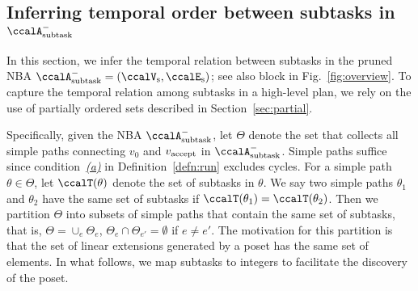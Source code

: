 \documentclass[Afour,sageh,times]{sagej}
\newcommand*\circled[1]{\tikz[baseline=(char.base)]{
            \node[shape=circle,draw,inner sep=1pt] (char) {#1};}}
\newtheorem{rem}[thm]{Remark}
\newcommand{\auto}[1]{\ccalA_{\textup{#1}}}
\newcommand{\vertex}[1]{v_{\textup{#1}}}
\newcommand{\node}[1]{V_{n}^{\text{#1}}}
\begin{document}




\subsection{Inferring temporal order between subtasks in  $\auto{subtask}^-$}\label{sec:poset}
In this section,  we infer the temporal relation between subtasks in the pruned NBA $\auto{subtask}^- = (\ccalV_\text{s}, \ccalE_\text{s})$; see also block \circled{2} in Fig.~\ref{fig:overview}.  To capture the temporal relation among subtasks in a high-level plan,  we rely on the use of partially ordered sets described in Section~\ref{sec:partial}.


Specifically, given the NBA $\auto{subtask}^-$, let $\Theta$ denote the set that collects all simple paths connecting $v_0$ and $\vertex{accept}$ in $\auto{subtask}^-$. Simple paths suffice since condition~\hyperref[cond:a]{\it (a)} in Definition~\ref{defn:run} excludes cycles. %
For a simple path $\theta \in\Theta$, let $\ccalT(\theta)$ denote the set of subtasks in $\theta$. We say two simple paths $\theta_1$ and $\theta_2$ have the same set of subtasks if $\ccalT(\theta_1) =\ccalT(\theta_2)$. Then we partition $\Theta$ into subsets of  simple paths that contain the same set of subtasks, that is, $\Theta = \cup_e \Theta_e$, $\Theta_e \cap \Theta_{e'} = \emptyset$ if $e\not=e'$. The motivation for this partition is that the set of linear extensions generated by a poset has the same set of elements. {In what follows, we map subtasks to integers to facilitate the discovery of the  poset.}
\end{document}
